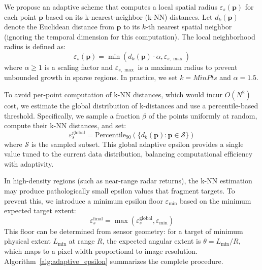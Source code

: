 \documentclass[conf]{new-aiaa}
\begin{document}
We propose an adaptive scheme that computes a local spatial radius $\varepsilon_s(\mathbf{p})$ for each point $\mathbf{p}$ based on its k-nearest-neighbor (k-NN) distances. Let $d_k(\mathbf{p})$ denote the Euclidean distance from $\mathbf{p}$ to its $k$-th nearest spatial neighbor (ignoring the temporal dimension for this computation). The local neighborhood radius is defined as:
\begin{equation}
    \varepsilon_s(\mathbf{p}) = \min\left( d_k(\mathbf{p}) \cdot \alpha, \varepsilon_{s,\max} \right)
\end{equation}
where $\alpha \geq 1$ is a scaling factor and $\varepsilon_{s,\max}$ is a maximum radius to prevent unbounded growth in sparse regions. In practice, we set $k = \mathit{MinPts}$ and $\alpha = 1.5$.

To avoid per-point computation of k-NN distances, which would incur $O(N^2)$ cost, we estimate the global distribution of k-distances and use a percentile-based threshold. Specifically, we sample a fraction $\beta$ of the points uniformly at random, compute their k-NN distances, and set:
\begin{equation}
    \varepsilon_s^{\text{global}} = \text{Percentile}_{90}\left( \{ d_k(\mathbf{p}) : \mathbf{p} \in \mathcal{S} \} \right)
\end{equation}
where $\mathcal{S}$ is the sampled subset. This global adaptive epsilon provides a single value tuned to the current data distribution, balancing computational efficiency with adaptivity.

In high-density regions (such as near-range radar returns), the k-NN estimation may produce pathologically small epsilon values that fragment targets. To prevent this, we introduce a minimum epsilon floor $\varepsilon_{\min}$ based on the minimum expected target extent:
\begin{equation}
    \varepsilon_s^{\text{final}} = \max\left( \varepsilon_s^{\text{global}}, \varepsilon_{\min} \right)
\end{equation}
This floor can be determined from sensor geometry: for a target of minimum physical extent $L_{\min}$ at range $R$, the expected angular extent is $\theta = L_{\min}/R$, which maps to a pixel width proportional to image resolution. Algorithm~\ref{alg:adaptive_epsilon} summarizes the complete procedure.
\end{document}
